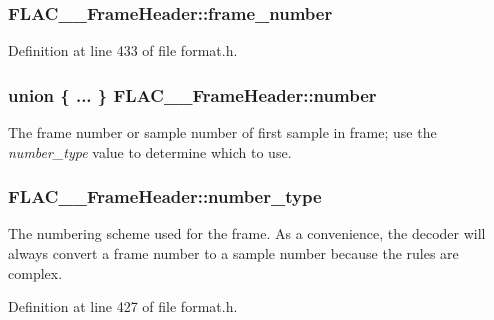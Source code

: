 \subsubsection[{\texorpdfstring{frame\+\_\+number}{frame_number}}]{ F\+L\+A\+C\+\_\+\+\_\+\+Frame\+Header\+::frame\+\_\+number}\hypertarget{struct_f_l_a_c_____frame_header_aa8f183fd8bcb5b73c392ae9ba7da4dbb}{}\label{struct_f_l_a_c_____frame_header_aa8f183fd8bcb5b73c392ae9ba7da4dbb}


Definition at line 433 of file format.\+h.

\subsubsection[{\texorpdfstring{number}{number}}]{\setlength{\rightskip}{0pt plus 5cm}union \{ ... \}   F\+L\+A\+C\+\_\+\+\_\+\+Frame\+Header\+::number}\hypertarget{struct_f_l_a_c_____frame_header_abdb6ca9267e5536f2c6e0f3e3c7adbf2}{}\label{struct_f_l_a_c_____frame_header_abdb6ca9267e5536f2c6e0f3e3c7adbf2}
The frame number or sample number of first sample in frame; use the {\itshape number\+\_\+type} value to determine which to use. 
\subsubsection[{\texorpdfstring{number\+\_\+type}{number_type}}]{ F\+L\+A\+C\+\_\+\+\_\+\+Frame\+Header\+::number\+\_\+type}\hypertarget{struct_f_l_a_c_____frame_header_a7a62ec09e6f3029297179ef65377265f}{}\label{struct_f_l_a_c_____frame_header_a7a62ec09e6f3029297179ef65377265f}
The numbering scheme used for the frame. As a convenience, the decoder will always convert a frame number to a sample number because the rules are complex. 

Definition at line 427 of file format.\+h.

